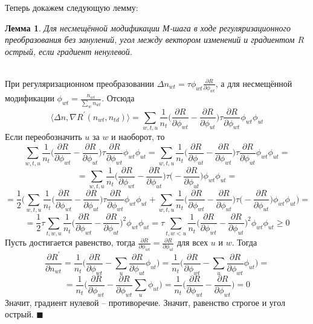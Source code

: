 \documentclass[12pt]{article}
\newtheorem{lemma}[remark]{Лемма}
\newenvironment{Proof} 
	{\par\noindent{\bf Доказательство.}} 
	{\hfill$\blacksquare$}
\renewcommand{\geq}{\geqslant}
\begin{document}
Теперь докажем следующую лемму:
\begin{lemma}           
 Для несмещённой модификации М-шага в ходе регуляризационного преобразования  без занулений, угол  между вектором изменений и градиентом $R$ острый, если градиент ненулевой.
\end{lemma}
\begin{Proof}\\
При регуляризационном преобразовании $\Delta n_{wt} = \tau \phi_{wt} \frac{\partial{R}}{\partial{\phi_{wt}}}$, а для несмещённой модификации $\phi_{wt} = \frac{n_{wt}}{\sum\limits_w n_{wt}}$. Отсюда
\[
\langle \Delta n, \nabla R^{\prime}(n_{wt}, n_{td})\rangle = \sum\limits_{w, t, u}  \frac{1}{n_{t}}  \bigg(  \frac{\partial{R}}{\partial{\phi_{wt}}}  -  \frac{\partial{R}}{\partial{\phi_{ut}}}  \bigg)  \tau \frac{\partial{R}}{\partial{\phi_{wt}}} \phi_{wt} \phi_{ut}
\]
Если переобозначить $u$ за $w$ и наоборот, то 
\[
\sum\limits_{w, t, u}  \frac{1}{n_{t}}  \bigg(  \frac{\partial{R}}{\partial{\phi_{wt}}}  -  \frac{\partial{R}}{\partial{\phi_{ut}}}  \bigg)  \tau \frac{\partial{R}}{\partial{\phi_{wt}}} \phi_{wt} \phi_{ut}  = \sum\limits_{w, t, u}  \frac{1}{n_{t}}  \bigg(  \frac{\partial{R}}{\partial{\phi_{ut}}}  -  \frac{\partial{R}}{\partial{\phi_{wt}}}  \bigg)  \tau \frac{\partial{R}}{\partial{\phi_{ut}}} \phi_{wt} \phi_{ut} = 
\]
\[
= \sum\limits_{w, t, u}  \frac{1}{n_{t}}  \bigg(  \frac{\partial{R}}{\partial{\phi_{wt}}}  -  \frac{\partial{R}}{\partial{\phi_{ut}}}  \bigg)  \tau \big(-\frac{\partial{R}}{\partial{\phi_{ut}}}\big) \phi_{wt} \phi_{ut} = 
\]
\[
= \frac12 \bigg(\sum\limits_{w, t, u}  \frac{1}{n_{t}}  \bigg(  \frac{\partial{R}}{\partial{\phi_{wt}}}  -  \frac{\partial{R}}{\partial{\phi_{ut}}}  \bigg)  \tau \frac{\partial{R}}{\partial{\phi_{wt}}} \phi_{wt} \phi_{ut} +  \sum\limits_{w, t, u}  \frac{1}{n_{t}}  \bigg(  \frac{\partial{R}}{\partial{\phi_{wt}}}  -  \frac{\partial{R}}{\partial{\phi_{ut}}}  \bigg)  \tau \big(-\frac{\partial{R}}{\partial{\phi_{ut}}}\big) \phi_{wt} \phi_{ut} \bigg)= 
\]
\[
= \frac12 \tau \sum\limits_{t, w, u}  \frac{1}{n_{t}} \bigg(  \frac{\partial{R}}{\partial{\phi_{wt}}}  -  \frac{\partial{R}}{\partial{\phi_{ut}}}  \bigg)^2 \phi_{wt} \phi_{ut} = \tau \sum\limits_{t, w < u}  \frac{1}{n_{t}} \bigg(  \frac{\partial{R}}{\partial{\phi_{wt}}}  -  \frac{\partial{R}}{\partial{\phi_{ut}}}  \bigg)^2 \phi_{wt} \phi_{ut} \geq 0
\]
Пусть достигается равенство, тогда $\frac{\partial{R}}{\partial{\phi_{wt}}}  =  \frac{\partial{R}}{\partial{\phi_{ut}}}$ для всех $u$ и $w$. Тогда
\[
\frac{\partial{R^{\prime}}}{\partial{n_{wt}}} = \frac{1}{n_t} \bigg( \frac{\partial{R}}{\partial{\phi_{wt}}} - \sum_{u}  \frac{\partial{R}}{\partial{\phi_{ut}}} \phi_{ut} \bigg) = \frac{1}{n_t} \bigg( \frac{\partial{R}}{\partial{\phi_{wt}}} - \sum_{u}  \frac{\partial{R}}{\partial{\phi_{wt}}} \phi_{ut} \bigg) =
\]
\[
=\frac{1}{n_t} \bigg( \frac{\partial{R}}{\partial{\phi_{wt}}} - \frac{\partial{R}}{\partial{\phi_{wt}}} \sum_{u} \phi_{ut} \bigg)  = \frac{1}{n_t} \bigg( \frac{\partial{R}}{\partial{\phi_{wt}}} - \frac{\partial{R}}{\partial{\phi_{wt}}} \bigg) = 0
\]
Значит, градиент нулевой -- противоречие. Значит, равенство строгое и угол острый.
\end{Proof}\ \\
\end{document}
